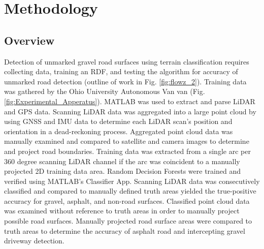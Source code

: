 \documentclass[journal,onecolumn]{IEEEtran}
\begin{document}
	
	
	
	
	
	\section{Methodology}
	
		\subsection{Overview}
	
			{Detection of unmarked gravel road surfaces using terrain classification requires collecting data, training an RDF, and testing the algorithm for accuracy of unmarked road detection (outline of work in Fig. \ref{fig:flowz_2}). Training data was gathered by the Ohio University Autonomous Van van (Fig. \ref{fig:Experimental_Apperatus}). MATLAB was used to extract and parse LiDAR and GPS data. Scanning LiDAR data was aggregated into a large point cloud by using GNSS and IMU data to determine each LiDAR scan's position and orientation in a dead-reckoning process. Aggregated point cloud data was manually examined and compared to satellite and camera images to determine and project road boundaries. Training data was extracted from a single arc per 360 degree scanning LiDAR channel if the arc was coincident to a manually projected 2D training data area. Random Decision Forests were trained and verified using MATLAB's Classifier App. Scanning LiDAR data was consecutively classified and compared to manually defined truth areas yielded the true-positive accuracy for gravel, asphalt, and non-road surfaces. Classified point cloud data was examined without reference to truth areas in order to manually project possible road surfaces. Manually projected road surface areas were compared to truth areas to determine the accuracy of asphalt road and intercepting gravel driveway detection.}
			
\end{document}

